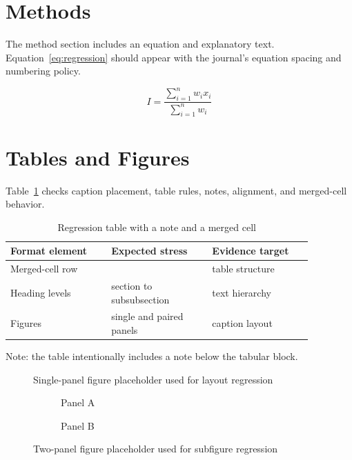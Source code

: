 \section{Methods}
The method section includes an equation and explanatory text. Equation~\ref{eq:regression} should appear with the journal's equation spacing and numbering policy.

\begin{equation}
I = \frac{\sum_{i=1}^{n} w_i x_i}{\sum_{i=1}^{n} w_i}
\label{eq:regression}
\end{equation}

\section{Tables and Figures}
Table~\ref{tab:regression} checks caption placement, table rules, notes, alignment, and merged-cell behavior.

\begin{table}[htbp]
\centering
\caption{Regression table with a note and a merged cell}
\label{tab:regression}
\begin{threeparttable}
\begin{tabular}{@{}p{0.29\linewidth}@{}p{0.29\linewidth}@{}p{0.29\linewidth}@{}}
\toprule
Format element & Expected stress & Evidence target \\
\midrule
\multicolumn{2}{l}{Merged-cell row} & table structure \\
Heading levels & section to subsubsection & text hierarchy \\
Figures & single and paired panels & caption layout \\
\bottomrule
\end{tabular}
\begin{tablenotes}
\small
\item Note: the table intentionally includes a note below the tabular block.
\end{tablenotes}
\end{threeparttable}
\end{table}

\begin{figure}[htbp]
\centering
\fbox{\rule{0pt}{35mm}\rule{0.82\linewidth}{0pt}}
\caption{Single-panel figure placeholder used for layout regression}
\label{fig:single}
\end{figure}

\begin{figure}[htbp]
\centering
\begin{subfigure}{0.46\linewidth}
\centering
\fbox{\rule{0pt}{25mm}\rule{0.82\linewidth}{0pt}}
\caption{Panel A}
\end{subfigure}\hfill
\begin{subfigure}{0.46\linewidth}
\centering
\fbox{\rule{0pt}{25mm}\rule{0.82\linewidth}{0pt}}
\caption{Panel B}
\end{subfigure}
\caption{Two-panel figure placeholder used for subfigure regression}
\label{fig:paired}
\end{figure}

